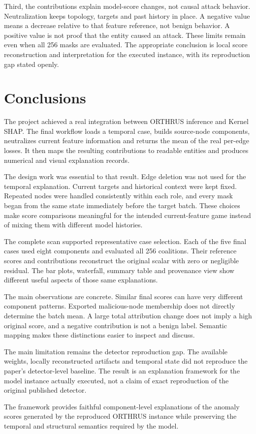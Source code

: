 \documentclass[11pt,a4paper]{article}
\begin{document}
Third, the contributions explain model-score changes, not causal attack
behavior. Neutralization keeps topology, targets and past history in place.
A negative value means a decrease relative to that feature reference, not
benign behavior. A positive value is not proof that the entity caused an attack.
These limits remain even when all 256 masks are evaluated. The appropriate
conclusion is local score reconstruction and interpretation for the executed
instance, with its reproduction gap stated openly.

\section{Conclusions}
The project achieved a real integration between ORTHRUS inference and Kernel
SHAP. The final workflow loads a temporal case, builds source-node components,
neutralizes current feature information and returns the mean of the real
per-edge losses. It then maps the resulting contributions to readable entities
and produces numerical and visual explanation records.

The design work was essential to that result. Edge deletion was not used for
the temporal explanation. Current targets and historical context were kept
fixed. Repeated nodes were handled consistently within each role, and every
mask began from the same state immediately before the target batch. These
choices make score comparisons meaningful for the intended current-feature
game instead of mixing them with different model histories.

The complete scan supported representative case selection. Each of the five
final cases used eight components and evaluated all 256 coalitions. Their
reference scores and contributions reconstruct the original scalar with zero
or negligible residual. The bar plots, waterfall, summary table and provenance
view show different useful aspects of those same explanations.

The main observations are concrete. Similar final scores can have very different
component patterns. Exported malicious-node membership does not directly
determine the batch mean. A large total attribution change does not imply a
high original score, and a negative contribution is not a benign label.
Semantic mapping makes these distinctions easier to inspect and discuss.

The main limitation remains the detector reproduction gap. The available
weights, locally reconstructed artifacts and temporal state did not reproduce
the paper's detector-level baseline. The result is an explanation framework
for the model instance actually executed, not a claim of exact reproduction
of the original published detector.

The framework provides faithful component-level explanations of the anomaly
scores generated by the reproduced ORTHRUS instance while preserving the
temporal and structural semantics required by the model.
\end{document}
